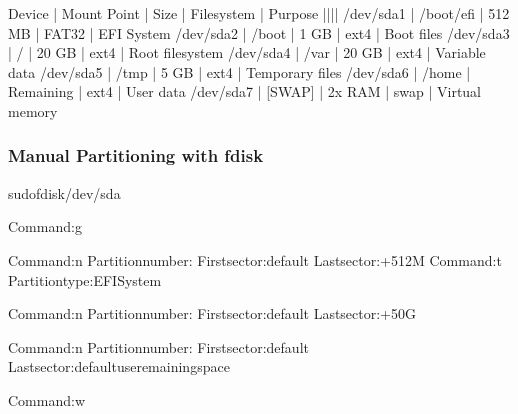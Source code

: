 \documentclass[letterpaper,10pt,english]{sphinxmanual}
\begin{document}
\sphinxAtStartPar
{}

\begin{sphinxVerbatim}[commandchars=\\\{\}]
Device    | Mount Point | Size      | Filesystem | Purpose
\PYGZhy{}\PYGZhy{}\PYGZhy{}\PYGZhy{}\PYGZhy{}\PYGZhy{}\PYGZhy{}\PYGZhy{}\PYGZhy{}\PYGZhy{}|\PYGZhy{}\PYGZhy{}\PYGZhy{}\PYGZhy{}\PYGZhy{}\PYGZhy{}\PYGZhy{}\PYGZhy{}\PYGZhy{}\PYGZhy{}\PYGZhy{}\PYGZhy{}\PYGZhy{}|\PYGZhy{}\PYGZhy{}\PYGZhy{}\PYGZhy{}\PYGZhy{}\PYGZhy{}\PYGZhy{}\PYGZhy{}\PYGZhy{}\PYGZhy{}\PYGZhy{}|\PYGZhy{}\PYGZhy{}\PYGZhy{}\PYGZhy{}\PYGZhy{}\PYGZhy{}\PYGZhy{}\PYGZhy{}\PYGZhy{}\PYGZhy{}\PYGZhy{}\PYGZhy{}|\PYGZhy{}\PYGZhy{}\PYGZhy{}\PYGZhy{}\PYGZhy{}\PYGZhy{}\PYGZhy{}\PYGZhy{}\PYGZhy{}\PYGZhy{}\PYGZhy{}\PYGZhy{}\PYGZhy{}\PYGZhy{}\PYGZhy{}\PYGZhy{}\PYGZhy{}\PYGZhy{}
/dev/sda1 | /boot/efi   | 512 MB    | FAT32      | EFI System
/dev/sda2 | /boot       | 1 GB      | ext4       | Boot files
/dev/sda3 | /           | 20 GB     | ext4       | Root filesystem
/dev/sda4 | /var        | 20 GB     | ext4       | Variable data
/dev/sda5 | /tmp        | 5 GB      | ext4       | Temporary files
/dev/sda6 | /home       | Remaining | ext4       | User data
/dev/sda7 | [SWAP]      | 2x RAM    | swap       | Virtual memory
\end{sphinxVerbatim}


\subsubsection{Manual Partitioning with fdisk}
\label{\detokenize{ubuntu-setup:manual-partitioning-with-fdisk}}
\begin{sphinxVerbatim}[commandchars=\\\{\}]
sudofdisk/dev/sda

Command:g

Command:n
Partitionnumber:
Firstsector:default
Lastsector:+512M
Command:t
Partitiontype:EFISystem

Command:n
Partitionnumber:
Firstsector:default
Lastsector:+50G

Command:n
Partitionnumber:
Firstsector:default
Lastsector:default\PYGZhy{}useremainingspace

Command:w
\end{sphinxVerbatim}
\end{document}

